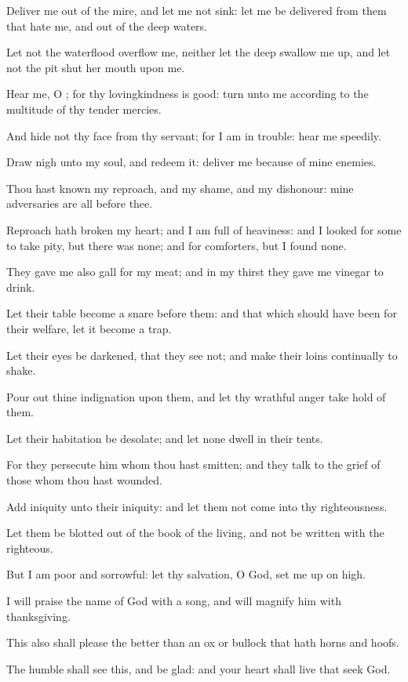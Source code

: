 \verse Deliver me out of the mire, and let me not sink: let me be delivered from them that hate me, and out of the deep waters.

\verse Let not the waterflood overflow me, neither let the deep swallow me up, and let not the pit shut her mouth upon me.

\verse Hear me, O \LORD; for thy lovingkindness is good: turn unto me according to the multitude of thy tender mercies.

\verse And hide not thy face from thy servant; for I am in trouble: hear me speedily.

\verse Draw nigh unto my soul, and redeem it: deliver me because of mine enemies.

\verse Thou hast known my reproach, and my shame, and my dishonour: mine adversaries are all before thee.

\verse Reproach hath broken my heart; and I am full of heaviness: and I looked for some to take pity, but there was none; and for comforters, but I found none.

\verse They gave me also gall for my meat; and in my thirst they gave me vinegar to drink.

\verse Let their table become a snare before them: and that which should have been for their welfare, let it become a trap.

\verse Let their eyes be darkened, that they see not; and make their loins continually to shake.

\verse Pour out thine indignation upon them, and let thy wrathful anger take hold of them.

\verse Let their habitation be desolate; and let none dwell in their tents.

\verse For they persecute him whom thou hast smitten; and they talk to the grief of those whom thou hast wounded.

\verse Add iniquity unto their iniquity: and let them not come into thy righteousness.

\verse Let them be blotted out of the book of the living, and not be written with the righteous.

\verse But I am poor and sorrowful: let thy salvation, O God, set me up on high.

\verse I will praise the name of God with a song, and will magnify him with thanksgiving.

\verse This also shall please the \LORD better than an ox or bullock that hath horns and hoofs.

\verse The humble shall see this, and be glad: and your heart shall live that seek God.

